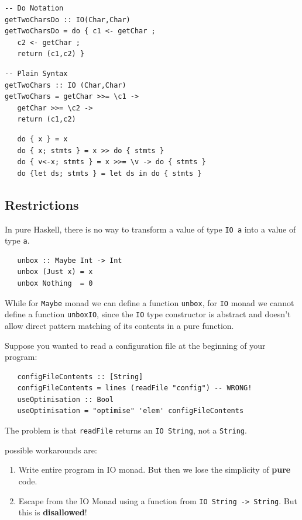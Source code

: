 \begin{paracol}{2}
\begin{lstlisting}
-- Do Notation
getTwoCharsDo :: IO(Char,Char)
getTwoCharsDo = do { c1 <- getChar ;
   c2 <- getChar ;
   return (c1,c2) }
\end{lstlisting}
\switchcolumn
\begin{lstlisting}
-- Plain Syntax
getTwoChars :: IO (Char,Char)
getTwoChars = getChar >>= \c1 ->
   getChar >>= \c2 ->
   return (c1,c2)
\end{lstlisting}

\end{paracol}

\begin{lstlisting}
   do { x } = x
   do { x; stmts } = x >> do { stmts }
   do { v<-x; stmts } = x >>= \v -> do { stmts }
   do {let ds; stmts } = let ds in do { stmts }
\end{lstlisting}

\subsection{Restrictions}
In pure Haskell, there is no way to transform a value of type
\lstinline|IO a| into a value of type \lstinline|a|.
\begin{lstlisting}
   unbox :: Maybe Int -> Int
   unbox (Just x) = x
   unbox Nothing  = 0   
\end{lstlisting}
While for \lstinline|Maybe| monad we can define a function \lstinline|unbox|, for \lstinline|IO| monad we cannot define a function \lstinline|unboxIO|, since the \lstinline|IO| type constructor is abstract and doesn't allow direct pattern matching of its contents in a pure function. 

Suppose you wanted to read a configuration file at the
beginning of your program:
\begin{lstlisting}
   configFileContents :: [String]
   configFileContents = lines (readFile "config") -- WRONG!
   useOptimisation :: Bool
   useOptimisation = "optimise" 'elem' configFileContents
\end{lstlisting}
The problem is that \lstinline|readFile| returns an \lstinline|IO String|, not a
\lstinline|String|.
{possible workarounds are:\ns
   \begin{enumerate}
      \item Write entire program in IO monad. But then we
      lose the simplicity of \textbf{pure} code.
      \item Escape from the IO Monad using a function from
      \lstinline|IO String -> String|. But this is \textbf{disallowed}!
   \end{enumerate}
}

